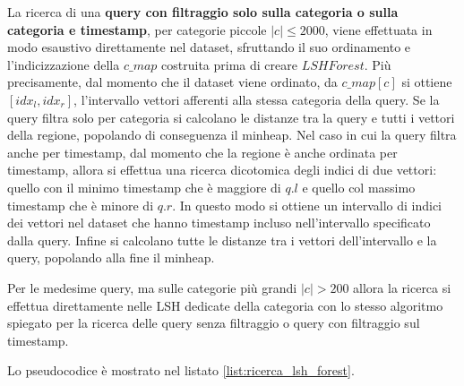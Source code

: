 La ricerca di una \textbf{query con filtraggio solo sulla categoria o sulla categoria e timestamp}, 
per categorie piccole $|c|\le 2000$, viene effettuata in modo esaustivo direttamente nel dataset,
sfruttando il suo ordinamento e l'indicizzazione della $c\_map$ costruita 
prima di creare $LSHForest$. 
Più precisamente, dal momento che il dataset viene ordinato, da $c\_map[c]$
si ottiene $[idx_l, idx_r]$, l'intervallo vettori afferenti alla stessa categoria della query. 
Se la query filtra solo per categoria si calcolano le distanze tra la query e tutti 
i vettori della regione, popolando di conseguenza il minheap. 
Nel caso in cui la query filtra anche per timestamp, 
dal momento che la regione è anche ordinata per timestamp, allora si effettua 
una ricerca dicotomica degli indici di due vettori: quello con il minimo timestamp che è 
maggiore di $q.l$ e quello col massimo timestamp che è minore di $q.r$.
In questo modo si ottiene un intervallo 
di indici dei vettori nel dataset che hanno timestamp incluso 
nell'intervallo specificato dalla query. Infine si calcolano tutte le distanze 
tra i vettori dell'intervallo e la query, popolando alla fine il minheap.

Per le medesime query, ma sulle categorie più grandi $|c|> 200$ allora la ricerca 
si effettua direttamente nelle LSH dedicate della categoria con lo stesso algoritmo 
spiegato per la ricerca delle query senza filtraggio o query con filtraggio sul timestamp.

Lo pseudocodice è mostrato nel listato \ref{list:ricerca_lsh_forest}.



